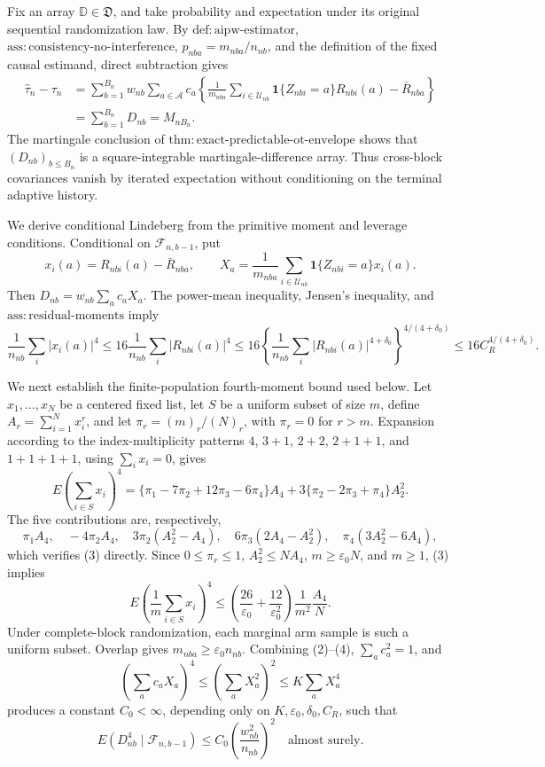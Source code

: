 Fix an array \(\mathbb D\in\mathfrak D\), and take probability and expectation under its original sequential randomization law. By \(\mathrm{def:aipw\text{-}estimator}\), \(\mathrm{ass:consistency\text{-}no\text{-}interference}\), \(p_{nba}=m_{nba}/n_{nb}\), and the definition of the fixed causal estimand, direct subtraction gives
\[
\begin{aligned}
\widehat\tau_n-\tau_n
&=\sum_{b=1}^{B_n}w_{nb}\sum_{a\in\mathcal A}c_a
\left\{\frac1{m_{nba}}\sum_{i\in\mathcal U_{nb}}
\mathbf1\{Z_{nbi}=a\}R_{nbi}(a)-\bar R_{nba}\right\}\\
&=\sum_{b=1}^{B_n}D_{nb}=M_{nB_n}.
\end{aligned}
\tag{1}
\]
The martingale conclusion of \(\mathrm{thm:exact\text{-}predictable\text{-}ot\text{-}envelope}\) shows that \((D_{nb})_{b\le B_n}\) is a square-integrable martingale-difference array. Thus cross-block covariances vanish by iterated expectation without conditioning on the terminal adaptive history.

We derive conditional Lindeberg from the primitive moment and leverage conditions. Conditional on \(\mathcal F_{n,b-1}\), put
\[
x_i(a)=R_{nbi}(a)-\bar R_{nba},
\qquad
X_a=\frac1{m_{nba}}\sum_{i\in\mathcal U_{nb}}
\mathbf1\{Z_{nbi}=a\}x_i(a).
\]
Then \(D_{nb}=w_{nb}\sum_ac_aX_a\). The power-mean inequality, Jensen's inequality, and \(\mathrm{ass:residual\text{-}moments}\) imply
\[
\frac1{n_{nb}}\sum_i|x_i(a)|^4
\le16\frac1{n_{nb}}\sum_i|R_{nbi}(a)|^4
\le16\left\{\frac1{n_{nb}}\sum_i|R_{nbi}(a)|^{4+\delta_0}\right\}^{4/(4+\delta_0)}
\le16C_R^{4/(4+\delta_0)}.
\tag{2}
\]

We next establish the finite-population fourth-moment bound used below. Let \(x_1,\ldots,x_N\) be a centered fixed list, let \(S\) be a uniform subset of size \(m\), define \(A_r=\sum_{i=1}^Nx_i^r\), and let \(\pi_r=(m)_r/(N)_r\), with \(\pi_r=0\) for \(r>m\). Expansion according to the index-multiplicity patterns \(4\), \(3+1\), \(2+2\), \(2+1+1\), and \(1+1+1+1\), using \(\sum_ix_i=0\), gives
\[
E\left(\sum_{i\in S}x_i\right)^4
=\{\pi_1-7\pi_2+12\pi_3-6\pi_4\}A_4
+3\{\pi_2-2\pi_3+\pi_4\}A_2^2.
\tag{3}
\]
The five contributions are, respectively,
\[
\pi_1A_4,\quad -4\pi_2A_4,\quad
3\pi_2(A_2^2-A_4),\quad
6\pi_3(2A_4-A_2^2),\quad
\pi_4(3A_2^2-6A_4),
\]
which verifies (3) directly. Since \(0\le\pi_r\le1\), \(A_2^2\le NA_4\), \(m\ge\varepsilon_0N\), and \(m\ge1\), (3) implies
\[
E\left(\frac1m\sum_{i\in S}x_i\right)^4
\le\left(\frac{26}{\varepsilon_0}+\frac{12}{\varepsilon_0^2}\right)
\frac1{m^2}\frac{A_4}{N}.
\tag{4}
\]
Under complete-block randomization, each marginal arm sample is such a uniform subset. Overlap gives \(m_{nba}\ge\varepsilon_0n_{nb}\). Combining (2)--(4), \(\sum_ac_a^2=1\), and
\[
\left(\sum_ac_aX_a\right)^4
\le\left(\sum_aX_a^2\right)^2
\le K\sum_aX_a^4
\]
produces a constant \(C_0<\infty\), depending only on \(K,\varepsilon_0,\delta_0,C_R\), such that
\[
E(D_{nb}^4\mid\mathcal F_{n,b-1})
\le C_0\left(\frac{w_{nb}^2}{n_{nb}}\right)^2
\quad\text{almost surely}.
\tag{5}
\]

